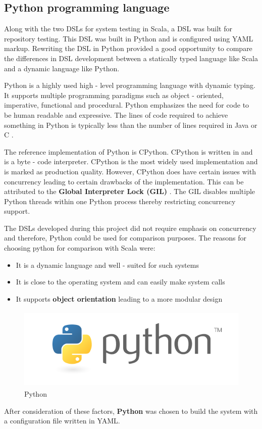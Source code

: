 \subsection{Python programming language}
Along with the two DSLs for system testing in Scala, a DSL was built for repository testing. This DSL was built in Python and is configured using YAML markup. Rewriting the DSL in Python provided a good opportunity to compare the differences in DSL development between a statically typed language like Scala and a dynamic language like Python.
\bigskip

\noindent
Python is a highly used high - level programming language with dynamic typing. It supports multiple programming paradigms such as object - oriented, imperative, functional and procedural. Python emphasizes the need for code to be human readable and expressive. The lines of code required to achieve something in Python is typically less than the number of lines required in Java or C \cite{pep}.
\bigskip

\noindent
The reference implementation of Python is CPython. CPython is written in and is a byte - code interpreter. CPython is the most widely used implementation and is marked as production quality. However, CPython does have certain issues with concurrency leading to certain drawbacks of the implementation. This can be attributed to the \textbf{Global Interpreter Lock (GIL)} \cite{cpython}. The GIL disables multiple Python threads within one Python process thereby restricting concurrency support.
\bigskip

\noindent
The DSLs developed during this project did not require emphasis on concurrency and therefore, Python could be used for comparison purposes. The reasons for choosing python for comparison with Scala were:
\begin{itemize}
\item It is a dynamic language and well - suited for such systems
\item It is close to the operating system and can easily make system calls
\item It supports \textbf{object orientation} leading to a more modular design \cite{python}
\end{itemize}

\begin{figure}[H]
  \centering
    \includegraphics[height=150px]{figures/python_lang.png}
  \caption{Python}
\end{figure}
After consideration of these factors, \textbf{Python} was chosen to build the system with a configuration file written in YAML.

